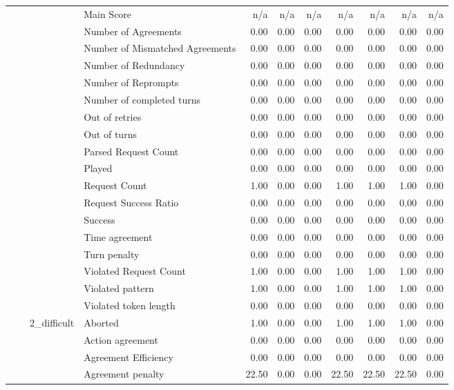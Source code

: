 \begin{tabular}{llllrrrrrrr}
 &  &  & Main Score & n/a & n/a & n/a & n/a & n/a & n/a & n/a \\
 &  &  & Number of Agreements & 0.00 & 0.00 & 0.00 & 0.00 & 0.00 & 0.00 & 0.00 \\
 &  &  & Number of Mismatched Agreements & 0.00 & 0.00 & 0.00 & 0.00 & 0.00 & 0.00 & 0.00 \\
 &  &  & Number of Redundancy & 0.00 & 0.00 & 0.00 & 0.00 & 0.00 & 0.00 & 0.00 \\
 &  &  & Number of Reprompts & 0.00 & 0.00 & 0.00 & 0.00 & 0.00 & 0.00 & 0.00 \\
 &  &  & Number of completed turns & 0.00 & 0.00 & 0.00 & 0.00 & 0.00 & 0.00 & 0.00 \\
 &  &  & Out of retries & 0.00 & 0.00 & 0.00 & 0.00 & 0.00 & 0.00 & 0.00 \\
 &  &  & Out of turns & 0.00 & 0.00 & 0.00 & 0.00 & 0.00 & 0.00 & 0.00 \\
 &  &  & Parsed Request Count & 0.00 & 0.00 & 0.00 & 0.00 & 0.00 & 0.00 & 0.00 \\
 &  &  & Played & 0.00 & 0.00 & 0.00 & 0.00 & 0.00 & 0.00 & 0.00 \\
 &  &  & Request Count & 1.00 & 0.00 & 0.00 & 1.00 & 1.00 & 1.00 & 0.00 \\
 &  &  & Request Success Ratio & 0.00 & 0.00 & 0.00 & 0.00 & 0.00 & 0.00 & 0.00 \\
 &  &  & Success & 0.00 & 0.00 & 0.00 & 0.00 & 0.00 & 0.00 & 0.00 \\
 &  &  & Time agreement & 0.00 & 0.00 & 0.00 & 0.00 & 0.00 & 0.00 & 0.00 \\
 &  &  & Turn penalty & 0.00 & 0.00 & 0.00 & 0.00 & 0.00 & 0.00 & 0.00 \\
 &  &  & Violated Request Count & 1.00 & 0.00 & 0.00 & 1.00 & 1.00 & 1.00 & 0.00 \\
 &  &  & Violated pattern & 1.00 & 0.00 & 0.00 & 1.00 & 1.00 & 1.00 & 0.00 \\
 &  &  & Violated token length & 0.00 & 0.00 & 0.00 & 0.00 & 0.00 & 0.00 & 0.00 \\
\cline{3-11}
 &  & \multirow[t]{27}{*}{2_difficult} & Aborted & 1.00 & 0.00 & 0.00 & 1.00 & 1.00 & 1.00 & 0.00 \\
 &  &  & Action agreement & 0.00 & 0.00 & 0.00 & 0.00 & 0.00 & 0.00 & 0.00 \\
 &  &  & Agreement Efficiency & 0.00 & 0.00 & 0.00 & 0.00 & 0.00 & 0.00 & 0.00 \\
 &  &  & Agreement penalty & 22.50 & 0.00 & 0.00 & 22.50 & 22.50 & 22.50 & 0.00 \\

\end{tabular}
